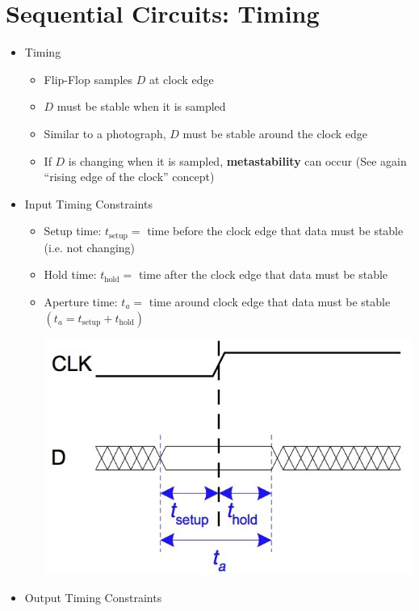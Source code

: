 \documentclass[a4paper]{article}
\begin{document}
\section{Sequential Circuits: Timing}
\begin{itemize}
\item Timing
\begin{itemize}
\item Flip-Flop samples $D$ at clock edge
\item $D$ must be stable when it is sampled
\item Similar to a photograph, $D$ must be stable around the clock edge
\item If $D$ is changing when it is sampled, \textbf{metastability} can occur (See again ``rising edge of the clock'' concept)
\end{itemize}
\item Input Timing Constraints
\begin{itemize}
\item Setup time: $t_{\text{setup}}=$ time before the clock edge that data must be stable (i.e. not changing)
\item Hold time: $t_{\text{hold}}=$ time after the clock edge that data must be stable
\item Aperture time: $t_a=$ time around clock edge that data must be stable $(t_a=t_{\text{setup}}+t_{\text{hold}})$ \\
\begin{center}
\includegraphics[scale=0.25]{Figures/inputTimingContraints.jpg}
\end{center}
\end{itemize}
\item Output Timing Constraints
\begin{itemize}

\end{itemize}
\end{itemize}
\end{document}

